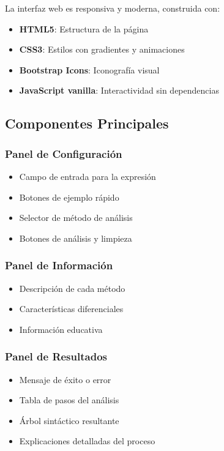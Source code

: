 \documentclass[12pt]{article}
\begin{document}
La interfaz web es responsiva y moderna, construida con:

\begin{itemize}
    \item \textbf{HTML5}: Estructura de la página
    \item \textbf{CSS3}: Estilos con gradientes y animaciones
    \item \textbf{Bootstrap Icons}: Iconografía visual
    \item \textbf{JavaScript vanilla}: Interactividad sin dependencias
\end{itemize}

\subsection{Componentes Principales}

\subsubsection{Panel de Configuración}

\begin{itemize}
    \item Campo de entrada para la expresión
    \item Botones de ejemplo rápido
    \item Selector de método de análisis
    \item Botones de análisis y limpieza
\end{itemize}

\subsubsection{Panel de Información}

\begin{itemize}
    \item Descripción de cada método
    \item Características diferenciales
    \item Información educativa
\end{itemize}

\subsubsection{Panel de Resultados}

\begin{itemize}
    \item Mensaje de éxito o error
    \item Tabla de pasos del análisis
    \item Árbol sintáctico resultante
    \item Explicaciones detalladas del proceso
\end{itemize}
\end{document}
